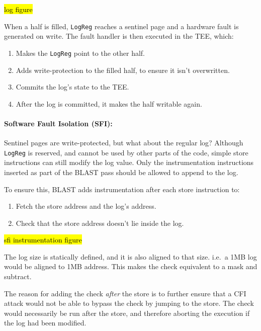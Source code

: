 \documentclass[a4paper, nobind]{templates/ociamthesis}
\providecommand{\tightlist}{%
  \setlength{\itemsep}{0pt}\setlength{\parskip}{0pt}}
\begin{document}
\hl{log figure}

When a half is filled, \texttt{LogReg} reaches a sentinel page and a hardware fault is generated on write.
The fault handler is then executed in the TEE, which:

\begin{enumerate}
\def\labelenumi{\arabic{enumi}.}
\tightlist
\item
  Makes the \texttt{LogReg} point to the other half.
\item
  Adds write-protection to the filled half, to ensure it isn't overwritten.
\item
  Commits the log's state to the TEE.
\item
  After the log is committed, it makes the half writable again.
\end{enumerate}

\paragraph{Software Fault Isolation (SFI):}\label{software-fault-isolation-sfi}

Sentinel pages are write-protected, but what about the regular log?
Although \texttt{LogReg} is reserved, and cannot be used by other parts of the code,
simple store instructions can still modify the log value. Only the instrumentation
instructions inserted as part of the BLAST pass should be allowed to append to the log.

To ensure this, BLAST adds instrumentation after each store instruction to:

\begin{enumerate}
\def\labelenumi{\arabic{enumi}.}
\tightlist
\item
  Fetch the store address and the log's address.
\item
  Check that the store address doesn't lie inside the log.
\end{enumerate}

\hl{sfi instrumentation figure}

The log size is statically defined, and it is also aligned to that size.
i.e.~a 1MB log would be aligned to 1MB address. This makes the check equivalent
to a mask and subtract.

The reason for adding the check \emph{after} the store is to further ensure that a
CFI attack would not be able to bypass the check by jumping to the store.
The check would necessarily be run after the store, and therefore aborting the
execution if the log had been modified.
\end{document}
